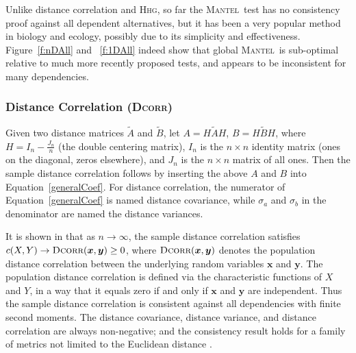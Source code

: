 \documentclass[11pt]{article}
\providecommand{\sct}[1]{{\normalfont\textsc{#1}}}
\providecommand{\mb}[1]{\boldsymbol{#1}}
\newcommand{\GG}{c}
\newcommand{\Hhg}{\sct{Hhg}}
\newcommand{\Dcorr}{\sct{Dcorr}}
\newcommand{\Mantel}{\sct{Mantel}}
\begin{document}
Unlike distance correlation and \Hhg, so far the \Mantel~test has no consistency proof against all dependent alternatives, 
but it has been a very popular method in biology and ecology, possibly due to its simplicity and effectiveness. Figure~\ref{f:nDAll} and ~\ref{f:1DAll} indeed show that global \Mantel~is sub-optimal relative to much more recently proposed tests, and appears to be inconsistent for many dependencies. 

\subsubsection{Distance Correlation (\Dcorr)}
\label{appen:dcorr}
Given two distance matrices $\tilde{A}$ and $\tilde{B}$, let $A=H\tilde{A}H$, $B=H\tilde{B}H$, where $H=I_{n}-\frac{J_{n}}{n}$ (the double centering matrix), $I_n$ is the $n \times n$ identity matrix (ones on the diagonal, zeros elsewhere), and $J_n$ is the $n \times n$ matrix of all ones. Then the sample distance correlation follows by inserting the above $A$ and $B$ into Equation~\ref{generalCoef}. For distance correlation, the numerator of Equation~\ref{generalCoef} is named distance covariance, while $\sigma_a$ and $\sigma_b$ in the denominator are named the distance variances. %

It is shown in \cite{SzekelyRizzoBakirov2007} that as $n \rightarrow \infty$, the sample distance correlation satisfies $\GG(X,Y) \rightarrow \Dcorr(\mb{x},\mb{y}) \geq 0$, where $\Dcorr(\mb{x},\mb{y})$ denotes the population distance correlation between the underlying random variables $\mb{x}$ and $\mb{y}$. 
The population distance correlation is defined via the characteristic functions of $X$ and $Y$, in a way that it equals zero if and only if $\mb{x}$ and $\mb{y}$ are independent. Thus the sample distance correlation is consistent against all dependencies with finite second moments. The distance covariance, distance variance, and distance correlation are always non-negative; and the consistency result holds for a family of metrics not limited to the Euclidean distance \cite{Lyons2013}. %
\end{document}
